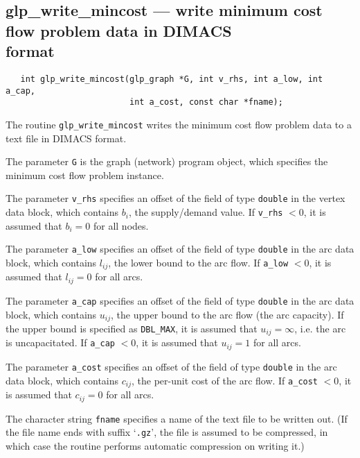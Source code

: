 \documentclass[11pt]{report}
\def\para#1{\noindent{\bf#1}}
\def\synopsis{\para{Synopsis}}
\def\description{\para{Description}}
\def\returns{\para{Returns}}
\begin{document}
\newpage

\subsection{glp\_write\_mincost --- write minimum cost flow problem
data in DIMACS\\format}

\synopsis

\begin{verbatim}
   int glp_write_mincost(glp_graph *G, int v_rhs, int a_low, int a_cap,
                         int a_cost, const char *fname);
\end{verbatim}

\description

The routine \verb|glp_write_mincost| writes the minimum cost flow
problem data to a text file in DIMACS format.

The parameter \verb|G| is the graph (network) program object, which
specifies the minimum cost flow problem instance.

The parameter \verb|v_rhs| specifies an offset of the field of type
\verb|double| in the vertex data block, which contains $b_i$, the
supply/demand value. If \verb|v_rhs| $<0$, it is assumed that $b_i=0$
for all nodes.

The parameter \verb|a_low| specifies an offset of the field of type
\verb|double| in the arc data block, which contains $l_{ij}$, the lower
bound to the arc flow. If \verb|a_low| $<0$, it is assumed that
$l_{ij}=0$ for all arcs.

The parameter \verb|a_cap| specifies an offset of the field of type
\verb|double| in the arc data block, which contains $u_{ij}$, the upper
bound to the arc flow (the arc capacity). If the upper bound is
specified as \verb|DBL_MAX|, it is assumed that $u_{ij}=\infty$, i.e.
the arc is uncapacitated. If \verb|a_cap| $<0$, it is assumed that
$u_{ij}=1$ for all arcs.

The parameter \verb|a_cost| specifies an offset of the field of type
\verb|double| in the arc data block, which contains $c_{ij}$, the
per-unit cost of the arc flow. If \verb|a_cost| $<0$, it is assumed
that $c_{ij}=0$ for all arcs.

The character string \verb|fname| specifies a name of the text file to
be written out. (If the file name ends with suffix `\verb|.gz|', the
file is assumed to be compressed, in which case the routine performs
automatic compression on writing it.)

\returns
\end{document}

